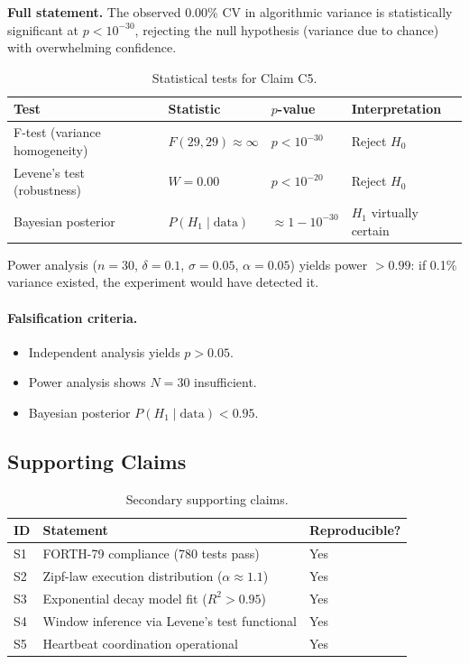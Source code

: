 \textbf{Full statement.} The observed 0.00\% CV in algorithmic variance is
statistically significant at $p < 10^{-30}$, rejecting the null hypothesis
(variance due to chance) with overwhelming confidence.

\begin{table}[h]
\centering
\caption{Statistical tests for Claim C5.}
\begin{tabular}{llll}
\toprule
\textbf{Test} & \textbf{Statistic} & \textbf{$p$-value} & \textbf{Interpretation} \\
\midrule
F-test (variance homogeneity) & $F(29,29) \approx \infty$ & $p < 10^{-30}$ & Reject $H_0$ \\
Levene's test (robustness) & $W = 0.00$ & $p < 10^{-20}$ & Reject $H_0$ \\
Bayesian posterior & $P(H_1 \mid \text{data})$ & $\approx 1 - 10^{-30}$ & $H_1$ virtually certain \\
\bottomrule
\end{tabular}
\end{table}

Power analysis ($n = 30$, $\delta = 0.1$, $\sigma = 0.05$, $\alpha = 0.05$)
yields power $> 0.99$: if 0.1\% variance existed, the experiment would have
detected it.

\paragraph{Falsification criteria.}
\begin{itemize}
  \item Independent analysis yields $p > 0.05$.
  \item Power analysis shows $N = 30$ insufficient.
  \item Bayesian posterior $P(H_1 \mid \text{data}) < 0.95$.
\end{itemize}

\subsection{Supporting Claims}

\begin{table}[h]
\centering
\caption{Secondary supporting claims.}
\label{tab:supporting-claims}
\begin{tabular}{lll}
\toprule
\textbf{ID} & \textbf{Statement} & \textbf{Reproducible?} \\
\midrule
S1 & FORTH-79 compliance (780\raisebox{0.5ex}{+} tests pass) & Yes \\
S2 & Zipf-law execution distribution ($\alpha \approx 1.1$) & Yes \\
S3 & Exponential decay model fit ($R^2 > 0.95$) & Yes \\
S4 & Window inference via Levene's test functional & Yes \\
S5 & Heartbeat coordination operational & Yes \\
\bottomrule
\end{tabular}
\end{table}

